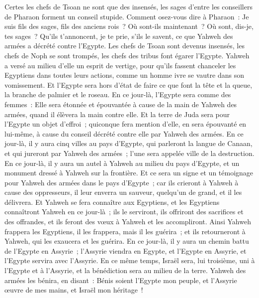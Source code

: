 \begin{multicols}{2}
Certes les chefs de Tsoan ne sont que des insensés, les sages d'entre les conseillers de Pharaon forment un conseil stupide. Comment osez-vous dire à Pharaon~: Je suis fils des sages, fils des anciens rois~?
Où sont-ils maintenant~? Où sont, dis-je, tes sages~? Qu'ils t'annoncent, je te prie, s'ils le savent, ce que Yahweh des armées a décrété contre l'Egypte.
Les chefs de Tsoan sont devenus insensés, les chefs de Noph se sont trompés, les chefs des tribus font égarer l'Egypte.
Yahweh a versé au milieu d'elle un esprit de vertige, pour qu'ils fassent chanceler les Egyptiens dans toutes leurs actions, comme un homme ivre se vautre dans son vomissement.
Et l'Egypte sera hors d'état de faire ce que font la tête et la queue, la branche de palmier et le roseau.
En ce jour-là, l'Egypte sera comme des femmes~: Elle sera étonnée et épouvantée à cause de la main de Yahweh des armées, quand il élèvera la main contre elle.
Et la terre de Juda sera pour l'Egypte un objet d'effroi~; quiconque fera mention d'elle, en sera épouvanté en lui-même, à cause du conseil décrété contre elle par Yahweh des armées.
En ce jour-là, il y aura cinq villes au pays d'Egypte, qui parleront la langue de Canaan, et qui jureront par Yahweh des armées~; l'une sera appelée ville de la destruction.
En ce jour-là, il y aura un autel à Yahweh au milieu du pays d'Egypte, et un monument dressé à Yahweh sur la frontière.
Et ce sera un signe et un témoignage pour Yahweh des armées dans le pays d'Egypte~; car ils crieront à Yahweh à cause des oppresseurs, il leur enverra un sauveur, quelqu'un de grand, et il les délivrera.
Et Yahweh se fera connaître aux Egyptiens, et les Egyptiens connaîtront Yahweh en ce jour-là~; ils le serviront, ils offriront des sacrifices et des offrandes, et ils feront des vœux à Yahweh et les accompliront.
Ainsi Yahweh frappera les Egyptiens, il les frappera, mais il les guérira~; et ils retourneront à Yahweh, qui les exaucera et les guérira.
En ce jour-là, il y aura un chemin battu de l'Egypte en Assyrie~; l'Assyrie viendra en Egypte, et l'Egypte en Assyrie, et l'Egypte servira avec l'Assyrie.
En ce même temps, Israël sera, lui troisième, uni à l'Egypte et à l'Assyrie, et la bénédiction sera au milieu de la terre.
Yahweh des armées les bénira, en disant~: Bénis soient l'Egypte mon peuple, et l'Assyrie œuvre de mes mains, et Israël mon héritage~!

\end{multicols}
